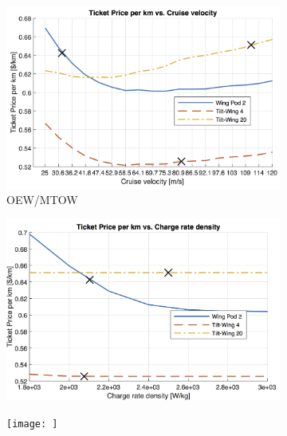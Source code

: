 \begin{figure}[H]
\begin{subfigure}[t]{0.33\textwidth}
    \centering
    \includegraphics[width=\textwidth]{Figures/Cruise_TPrice_perkmNOPAD.png}
    \captionsetup{justification=centering}
    \caption{OEW/MTOW}
    \label{fig:sens7}
\end{subfigure}
\begin{subfigure}[t]{0.33\textwidth}
    \centering
    \includegraphics[width=\textwidth]{Figures/CRate_TPrice_perkmNOPAD.png}
    \captionsetup{justification=centering}
    \caption{}
    \label{fig:sens8}
\end{subfigure}
\begin{subfigure}[t]{0.33\textwidth}
    \centering
    \texttt{[image: ]}
    \captionsetup{justification=centering}
    \caption{}
    \label{fig:sens9}
\end{subfigure}
\captionsetup{justification=centering}
\caption{}
\label{fig:sens789}
\end{figure}


